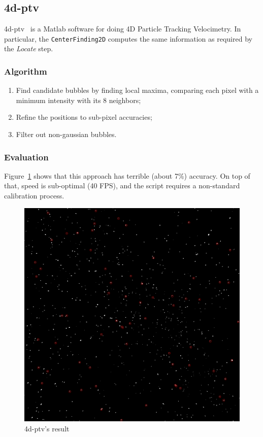 \subsection{4d-ptv}
\label{sec:locate:fourdptv}

4d-ptv~\cite{fourdptv} is a Matlab software for doing 4D Particle Tracking Velocimetry.
In particular, the \texttt{CenterFinding2D} computes the same information as required by the \textit{Locate} step.

\subsubsection{Algorithm}

\begin{enumerate}
	\itemsep 0em
	\item Find candidate bubbles by finding local maxima, comparing each pixel with a minimum intensity with its 8 neighbors;
	\item Refine the positions to sub-pixel accuracies;
	\item Filter out non-gaussian bubbles.
\end{enumerate}

\subsubsection{Evaluation}

Figure~\ref{fig:locate:fourdptv} shows that this approach has terrible (about 7\%) accuracy.
On top of that, speed is sub-optimal (40 FPS), and the script requires a non-standard calibration process.

\begin{figure}
	\centerline{\includegraphics[width=\locateimgsize]{images/locate/4d-ptv.png}}
	\caption{\centering 4d-ptv's result}
	\label{fig:locate:fourdptv}
\end{figure}
